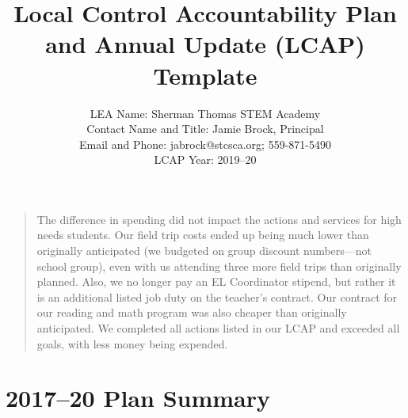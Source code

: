 \documentclass{article}
\newcounter{goal}[section] %
\newcounter{action}[goal]
\begin{document}
\begin{quotation}
The difference in spending did not impact the actions and services for high needs students. Our field trip costs ended up being much lower than originally anticipated (we budgeted on group discount numbers---not school group), even with us attending three more field trips than originally planned. Also, we no longer pay an EL Coordinator stipend, but rather it is an additional listed job duty on the teacher's contract. Our contract for our reading and math program was also cheaper than originally anticipated. We completed all actions listed in our LCAP and exceeded all goals, with less money being expended.
\end{quotation}

\title{Local Control Accountability Plan and Annual Update (LCAP) Template}
\author{
LEA Name: Sherman Thomas STEM Academy\\
Contact Name and Title: Jamie Brock, Principal\\
Email and Phone: jabrock@stcsca.org; 559-871-5490\\
LCAP Year: 2019--20
}
\date{}

\maketitle

\section{2017--20 Plan Summary}
\end{document}
